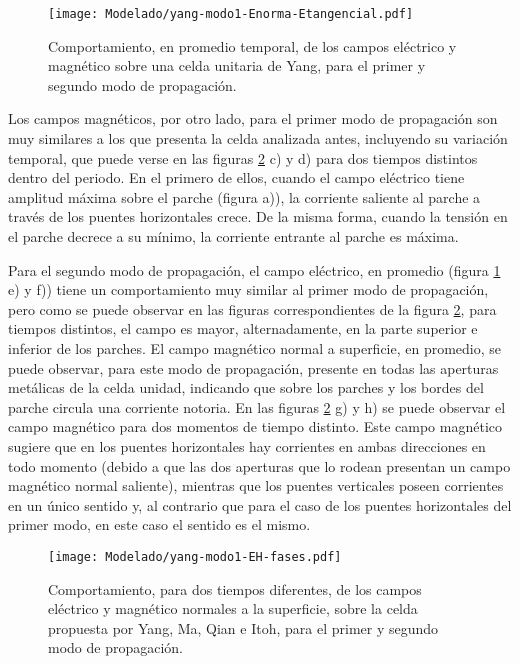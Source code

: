 \begin{figure}[h]
	\centering
	\texttt{[image: Modelado/yang-modo1-Enorma-Etangencial.pdf]}
	\caption{Comportamiento, en promedio temporal, de los campos eléctrico y magnético sobre una celda unitaria de Yang, para el primer y segundo modo de propagación.}
	\label{fig:yang-analisis-campos}
\end{figure}

Los campos magnéticos, por otro lado, para el primer modo de propagación son muy similares a los que presenta la celda analizada antes, incluyendo su variación temporal, que puede verse en las figuras \ref{fig:yang-analisis-campos-fases} c) y d) para dos tiempos distintos dentro del periodo. En el primero de ellos, cuando el campo eléctrico tiene amplitud máxima sobre el parche (figura a)), la corriente saliente al parche a través de los puentes horizontales crece. De la misma forma, cuando la tensión en el parche decrece a su mínimo, la corriente entrante al parche es máxima.

Para el segundo modo de propagación, el campo eléctrico, en promedio (figura \ref{fig:yang-analisis-campos} e) y f)) tiene un comportamiento muy similar al primer modo de propagación, pero como se puede observar en las figuras correspondientes de la figura \ref{fig:yang-analisis-campos-fases}, para tiempos distintos, el campo es mayor, alternadamente, en la parte superior e inferior de los parches. El campo magnético normal a superficie, en promedio, se puede observar, para este modo de propagación, presente en todas las aperturas metálicas de la celda unidad, indicando que sobre los parches y los bordes del parche circula una corriente notoria. En las figuras \ref{fig:yang-analisis-campos-fases} g) y h) se puede observar el campo magnético para dos momentos de tiempo distinto. Este campo magnético sugiere que en los puentes horizontales hay corrientes en ambas direcciones en todo momento (debido a que las dos aperturas que lo rodean presentan un campo magnético normal saliente), mientras que los puentes verticales poseen corrientes en un único sentido y, al contrario que para el caso de los puentes horizontales del primer modo, en este caso el sentido es el mismo.

\begin{figure}[h]
	\centering
	\texttt{[image: Modelado/yang-modo1-EH-fases.pdf]}
	\caption{Comportamiento, para dos tiempos diferentes, de los campos eléctrico y magnético normales a la superficie, sobre la celda propuesta por Yang, Ma, Qian e Itoh, para el primer y segundo modo de propagación.}
	\label{fig:yang-analisis-campos-fases}
\end{figure}


